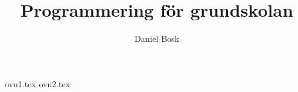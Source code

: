 \documentclass[a4paper]{book}
\title{Programmering för grundskolan}
\author{Daniel Bosk}
\begin{document}
\maketitle
\tableofcontents

{ovn1.tex}
{ovn2.tex}
\end{document}

